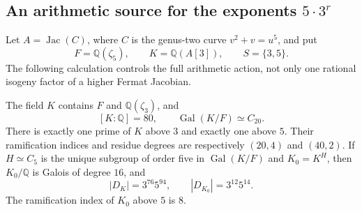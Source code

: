 \subsection{An arithmetic source for the exponents \texorpdfstring{$5\cdot3^r$}{5 times powers of three}}
\label{subsec:lm-fifteen-source}

Let $A=\operatorname{Jac}(C)$, where $C$ is the genus-two curve
$v^2+v=u^5$, and put
\[
 F=\mathbb Q(\zeta_5),\qquad K=\mathbb Q(A[3]),\qquad S=\{3,5\}.
\]
The following calculation controls the full arithmetic action, not only
one rational isogeny factor of a higher Fermat Jacobian.

\begin{proposition}
\label{prop:lm-a5-residual}
The field $K$ contains $F$ and $\mathbb Q(\zeta_3)$, and
\[
 [K:\mathbb Q]=80,\qquad
 \operatorname{Gal}(K/F)\simeq C_{20}.
\]
There is exactly one prime of $K$ above $3$ and exactly one above $5$.
Their ramification indices and residue degrees are respectively
$(20,4)$ and $(40,2)$.  If $H\simeq C_5$ is the unique subgroup of
order five in $\operatorname{Gal}(K/F)$ and $K_0=K^H$, then $K_0/\mathbb Q$
is Galois of degree $16$, and
\[
 |D_K|=3^{76}5^{94},\qquad |D_{K_0}|=3^{12}5^{14}.
 \tag{10.1}\label{eq:lm-residual-discriminants}
\]
The ramification index of $K_0$ above $5$ is $8$.
\end{proposition}
